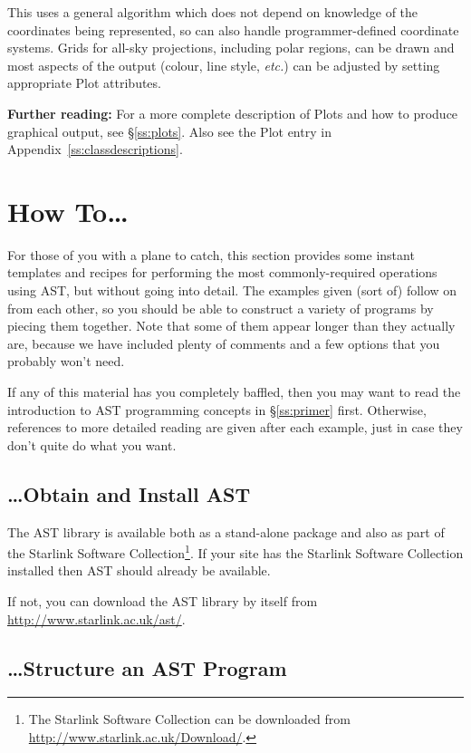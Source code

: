\documentclass[twoside,11pt]{starlink}
\providecommand{\appref}[1]{Appendix~\ref{#1}}
\providecommand{\secref}[1]{\S\ref{#1}}
\begin{document}
This uses a general algorithm which does not depend on knowledge of
the coordinates being represented, so can also handle
programmer-defined coordinate systems.  Grids for all-sky projections,
including polar regions, can be drawn and most aspects of the output
(colour, line style, \emph{etc.}) can be adjusted by setting
appropriate Plot attributes.

\textbf{Further reading:} For a more complete description of
Plots and how to produce graphical output, see \secref{ss:plots}. Also
see the Plot entry in \appref{ss:classdescriptions}.

\cleardoublepage
\section{\label{ss:howto}How To\ldots}

For those of you with a plane to catch, this section provides some
instant templates and recipes for performing the most
commonly-required operations using AST, but without going into
detail. The examples given (sort of) follow on from each other, so you
should be able to construct a variety of programs by piecing them
together.  Note that some of them appear longer than they actually
are, because we have included plenty of comments and a few options
that you probably won't need.

If any of this material has you completely baffled, then you may want
to read the introduction to AST programming concepts in
\secref{ss:primer} first. Otherwise, references to more detailed
reading are given after each example, just in case they don't quite do
what you want.

\subsection{\ldots Obtain and Install AST}
The AST library is available both as a stand-alone package and also as
part of the Starlink Software Collection\footnote{The Starlink Software
Collection can be downloaded from
\url{http://www.starlink.ac.uk/Download/}.}. If your site has the Starlink
Software Collection installed then AST should already be available.

If not, you can download the AST library by itself from
\url{http://www.starlink.ac.uk/ast/}.

\subsection{\ldots Structure an AST Program}
\end{document}
